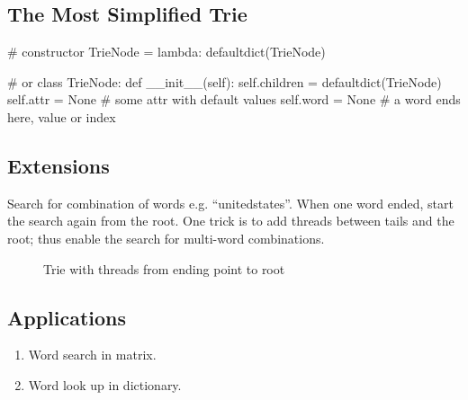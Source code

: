 \subsection{The Most Simplified Trie}
\begin{python}
# constructor 
TrieNode = lambda: defaultdict(TrieNode) 

# or
class TrieNode:
    def __init__(self):
        self.children = defaultdict(TrieNode)
        self.attr = None  # some attr with default values
        self.word = None  # a word ends here, value or index
\end{python}
\subsection{Extensions}
 Search for combination of words e.g. ``unitedstates''.  When one word ended, start the search again from the root. One trick is to add threads between tails and the root; thus enable the search for multi-word combinations. 
\begin{figure}[!hbt]
\centering
{}
\caption{Trie with threads from ending point to root}
\label{fig:trie2}
\end{figure}
\subsection{Applications}
\begin{enumerate}
\item Word search in matrix.
\item Word look up in dictionary.
\end{enumerate}
        
     
